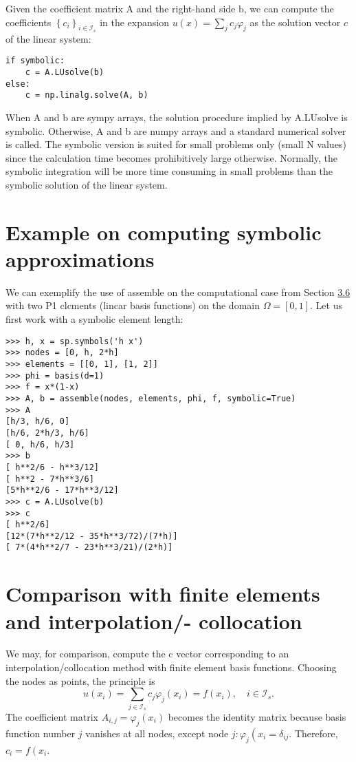 \documentclass[../main.tex]{subfiles}
\begin{document}
Given the coefficient matrix $\mathrm{A}$ and the right-hand side $\mathrm{b}$, we can compute the coefficients $\left\{c_{i}\right\}_{i \in \mathcal{I}_{s}}$ in the expansion $u(x)=\sum_{j} c_{j} \varphi_{j}$ as the solution vector $c$ of the linear system:
\begin{lstlisting}[numbers=none]
if symbolic:
	c = A.LUsolve(b)
else:
	c = np.linalg.solve(A, b)
\end{lstlisting}
When A and b are sympy arrays, the solution procedure implied by A.LUsolve is
symbolic. Otherwise, A and b are numpy arrays and a standard numerical solver
is called. The symbolic version is suited for small problems only (small N values)
since the calculation time becomes prohibitively large otherwise. Normally, the
symbolic integration will be more time consuming in small problems than the
symbolic solution of the linear system.
\section[Example on computing symbolic approximations]{Example on computing symbolic approximations}
\label{sec:sec_4_3}
We can exemplify the use of assemble on the computational case from Section \hyperref[sec:sec_3_6]{3.6} with two P1 clcments (lincar basis functions) on the domain $\Omega=[0,1]$. Let us first work with a symbolic element length:
\begin{lstlisting}[numbers=none]
>>> h, x = sp.symbols('h x')
>>> nodes = [0, h, 2*h]
>>> elements = [[0, 1], [1, 2]]
>>> phi = basis(d=1)
>>> f = x*(1-x)
>>> A, b = assemble(nodes, elements, phi, f, symbolic=True)
>>> A
[h/3, h/6, 0]
[h/6, 2*h/3, h/6]
[ 0, h/6, h/3]
>>> b
[ h**2/6 - h**3/12]
[ h**2 - 7*h**3/6]
[5*h**2/6 - 17*h**3/12]
>>> c = A.LUsolve(b)
>>> c
[ h**2/6]
[12*(7*h**2/12 - 35*h**3/72)/(7*h)]
[ 7*(4*h**2/7 - 23*h**3/21)/(2*h)]	
\end{lstlisting}
\section[Comparison with finite elements and interpolation/- collocation]{Comparison with finite elements and interpolation/- collocation}
\label{sec:sec_4_4}
We may, for comparison, compute the c vector corresponding to an interpolation/collocation method with finite element basis functions. Choosing the nodes as points, the principle is
$$
u\left(x_{i}\right)=\sum_{j \in \mathcal{I}_{s}} c_{j} \varphi_{j}\left(x_{i}\right)=f\left(x_{i}\right), \quad i \in \mathcal{I}_{s}.
$$
The coefficient matrix $A_{i, j}=\varphi_{j}\left(x_{i}\right)$ becomes the identity matrix because basis function number $j$ vanishes at all nodes, except node $j: \varphi_{j}\left(x_{i}=\delta_{i j}\right.$. Therefore, $c_{i}=f\left(x_{i}\right.$.
\end{document}

